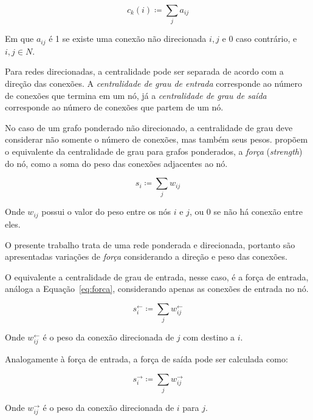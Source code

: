 \documentclass[12pt,a4paper]{article}
\theoremstyle{hypo}
\newcommand{\defn}{\coloneqq} %
\newcommand{\linkin}[1]{#1^\leftarrow} %
\newcommand{\linkout}[1]{#1^\rightarrow} %
\newcommand{\win}{w^\leftarrow} %
\newcommand{\wout}{w^\rightarrow} %
\begin{document}
\begin{equation} \label{eq:centralidade-grau}
c_k(i) \defn \sum_{j} a_{ij}
\end{equation}

Em que $a_{ij}$ é 1 se existe uma conexão não direcionada $i, j$ e 0 caso contrário, e $i,j \in N$. 

Para redes direcionadas, a centralidade pode ser separada de acordo com a direção das conexões. A \textit{centralidade de grau de entrada} corresponde ao número de conexões que termina em um nó, já a \textit{centralidade de grau de saída} corresponde ao número de conexões que partem de um nó.

No caso de um grafo ponderado não direcionado, a centralidade de grau deve considerar não somente o número de conexões, mas também seus pesos.  propõem o equivalente da centralidade de grau para grafos ponderados, a \textit{força} (\textit{strength}) do nó, como a soma do peso das conexões adjacentes ao nó.

\begin{equation} \label{eq:forca}
s_i \defn \sum_{j} w_{ij}
\end{equation}

Onde $w_{ij}$ possui o valor do peso entre os nós $i$ e $j$, ou 0 se não há conexão entre eles.

O presente trabalho trata de uma rede ponderada e direcionada, portanto são apresentadas variações de \textit{força} considerando a direção e peso das conexões.

O equivalente a centralidade de grau de entrada, nesse caso, é a força de entrada, análoga a Equação~\ref{eq:forca}, considerando apenas as conexões de entrada no nó.

\begin{equation} \label{eq:forca-entrada}
\linkin{s}_i \defn \sum_{j} \win_{ij}
\end{equation}

Onde $\win_{ij}$ é o peso da conexão direcionada de $j$ com destino a $i$.

Analogamente à força de entrada, a força de saída pode ser calculada como:

\begin{equation} \label{eq:forca-saida}
\linkout{s}_i \defn \sum_{j} \wout_{ij}
\end{equation}

Onde $\wout_{ij}$ é o peso da conexão direcionada de $i$ para $j$.

\end{document}
